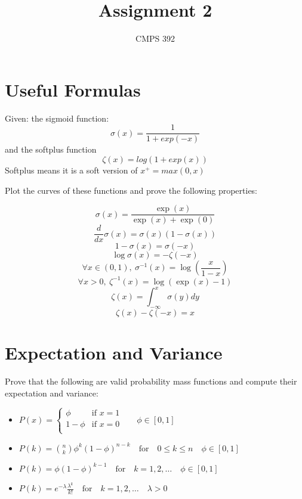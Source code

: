 \documentclass[11pt,oneside,a4paper]{article}
\title{Assignment 2}
\author{CMPS 392}
\date{}
\theoremstyle{definition}
\DeclareRobustCommand{\[}{\begin{equation}}
\DeclareRobustCommand{\]}{\end{equation}}
\begin{document}
\setlength{\parskip}{0.25 \baselineskip}
\newlength{\figwidth}
\setlength{\figwidth}{26pc}
\newlength{\notationgap}
\setlength{\notationgap}{1pc}



\maketitle

%  
%  

\section*{Useful Formulas} 
Given:
the sigmoid function: 
$$ \sigma(x) = \frac{1} {1 + exp(-x) } $$ 
and the softplus function 
$$ \zeta(x) = log(1+exp(x) ) $$ 
Softplus means it is a soft version of  $x^+ = max(0,x) $

Plot the curves of these functions and prove the following properties: 

     $$\sigma(x) = \frac{\exp(x)}{\exp(x)+\exp(0)}$$
     $$\frac{d}{d x} \sigma(x)=  \sigma(x) (1 -  \sigma(x) ) $$
     $$1-  \sigma(x) =  \sigma(-x)$$
     $$\log \sigma(x) = - \zeta(-x) $$
     $$\forall x \in (0,1),~ \sigma^{-1}(x) = \log(\frac{x}{1-x})$$
     $$\forall x >0,~ \zeta^{-1} (x) = \log (\exp(x)-1)$$
     $$\zeta(x) = \int_{-\infty}^x \sigma(y) d y $$
     $$\zeta(x) - \zeta(-x) = x $$


 
\section*{Expectation and Variance}
Prove that the following are valid probability mass functions and compute their expectation and variance: 

\begin{itemize}
    \item   $ \displaystyle P(x) = \begin{cases}
      \phi & \text{if $x = 1$ }\\
      1 - \phi & \text{if $x = 0$}\\
    \end{cases}  \quad  \phi \in [0,1]$
\item 
$ \displaystyle P(k) = 
{n \choose k}\phi^k (1-\phi)^{n-k} \quad \text{for} \quad  0 \leq k \leq n  \quad  \phi \in [0,1]$
\item 
$ \displaystyle
 P (k) = \phi (1-\phi)^{k-1} \quad \text{for} \quad k = 1,2, \ldots  \quad  \phi \in [0,1]
$
\item $ \displaystyle  P (k) =  e^{-\lambda} \frac{\lambda^k}{k!} \quad \text{for} \quad k = 1,2, \ldots \quad  \lambda > 0  $

\end{itemize}
\end{document}
